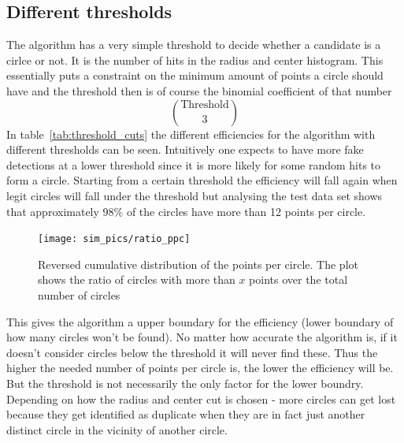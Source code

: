 \documentclass[11pt,twoside]{scrreprt}
\begin{document}
\subsection{Different thresholds} %
\label{sub:different_thresholds}
The algorithm has a very simple threshold to decide whether a candidate is a cirlce or not. It is the number of hits in the radius and center histogram.
This essentially puts a constraint on the minimum amount of points a circle should have and the threshold then is of course the binomial
coefficient of that number
\[
  \binom{\text{Threshold}}{3}
\]
In table~\ref{tab:threshold_cuts} the different efficiencies for the algorithm with different thresholds can be seen. Intuitively one expects to have more fake
detections at a lower threshold since it is more likely for some random hits to form a circle. Starting from a certain threshold the efficiency
will fall again when legit circles will fall under the threshold but analysing the test data set shows that approximately $98\%$ of the circles have more
than 12 points per circle.

\begin{figure}[tb]
  \centering
  \texttt{[image: sim\_pics/ratio\_ppc]}
  \caption{Reversed cumulative distribution of the points per circle. The plot shows the ratio of circles with more than $x$ points over the
  total number of circles}
  \label{fig:ratio_ppc}
\end{figure}

This gives the algorithm a upper boundary for the efficiency (lower boundary of how many circles won't be found). No matter 
how accurate the algorithm is, if it doesn't consider circles below the threshold it will never find these. Thus the higher 
the needed number of points per circle is, the lower the efficiency will be. But the threshold is not necessarily the only
factor for the lower boundry. Depending on how the radius and center cut is chosen - more circles can get lost because
they get identified as duplicate when they are in fact just another distinct circle in the vicinity of another circle.
\end{document}
